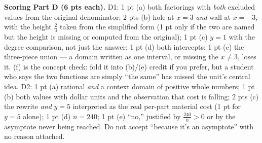 \documentclass[10pt]{article}
\begin{document}
\begin{teachernote}
\textbf{Scoring Part D (6 pts each).} D1: 1 pt (a) both factorings with \emph{both} excluded values
from the original denominator; 2 pts (b) hole at $x=3$ \emph{and} wall at $x=-3$, with the height
$\tfrac23$ taken from the simplified form (1 pt only if the two are named but the height is missing
or computed from the original); 1 pt (c) $y=1$ with the degree comparison, not just the answer;
1 pt (d) both intercepts; 1 pt (e) the three-piece union --- a domain written as one interval, or
missing the $x\ne3$, loses it. (f) is the concept check: fold it into (b)/(e) credit if you prefer,
but a student who says the two functions are simply ``the same'' has missed the unit's central idea.
D2: 1 pt (a) rational \emph{and} a context domain of positive whole numbers; 1 pt (b) both values
with dollar units and the observation that cost is falling; 2 pts (c) the rewrite \emph{and}
$y=5$ interpreted as the real per-part material cost (1 pt for $y=5$ alone); 1 pt (d) $n=240$;
1 pt (e) ``no,'' justified by $\tfrac{240}{n}>0$ or by the asymptote never being reached. Do not
accept ``because it's an asymptote'' with no reason attached.
\end{teachernote}
\end{document}
